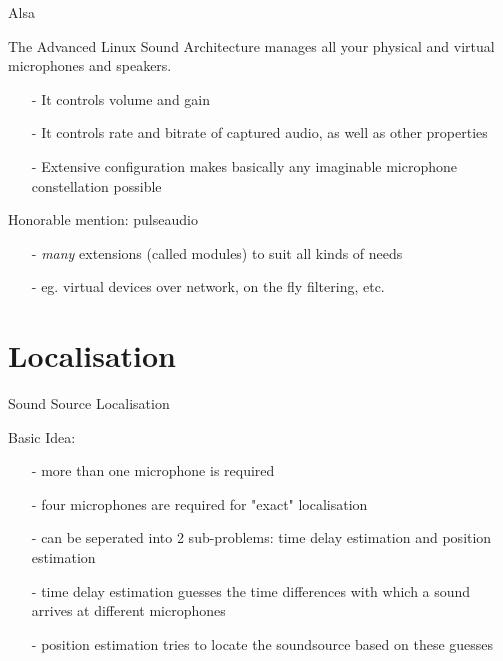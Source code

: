 \documentclass{beamer}
\begin{document}
	\begin{frame}{Alsa}
		\begin{alertblock}{The Advanced Linux Sound Architecture manages all your physical and virtual microphones and speakers.}
			\begin{itemize}
				\item[-] It controls volume and gain
				\item[-] It controls rate and bitrate of captured audio, as well as other properties
				\item[-] Extensive configuration makes basically any imaginable microphone constellation possible
			\end{itemize}
		\end{alertblock}
		
		\pause
		
		\begin{alertblock}{Honorable mention: pulseaudio}
			\pause
			\begin{itemize}
				\item[-] \emph{many} extensions (called modules) to suit all kinds of needs
				\item[-] eg. virtual devices over network, on the fly filtering, etc.
			\end{itemize}
		\end{alertblock}
	\end{frame}
	
	\section{Localisation}%
	
	\begin{frame}{Sound Source Localisation}
		\begin{alertblock}{Basic Idea:}
			\begin{itemize}
				\item[-] more than one microphone is required
				\item[-] four microphones are required for "exact" localisation
				\item[-] can be seperated into 2 sub-problems: time delay estimation and position estimation
				\item[-] time delay estimation guesses the time differences with which a sound arrives at different microphones
				\item[-] position estimation  tries to locate the soundsource based on these guesses
			\end{itemize}
		\end{alertblock}
	\end{frame}
	
\end{document}
